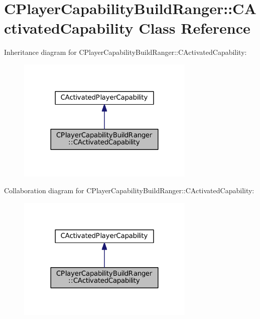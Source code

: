 \hypertarget{classCPlayerCapabilityBuildRanger_1_1CActivatedCapability}{}\section{C\+Player\+Capability\+Build\+Ranger\+:\+:C\+Activated\+Capability Class Reference}
\label{classCPlayerCapabilityBuildRanger_1_1CActivatedCapability}


Inheritance diagram for C\+Player\+Capability\+Build\+Ranger\+:\+:C\+Activated\+Capability\+:
\nopagebreak
\begin{figure}[H]
\begin{center}
\leavevmode
\includegraphics[width=240pt]{classCPlayerCapabilityBuildRanger_1_1CActivatedCapability__inherit__graph}
\end{center}
\end{figure}


Collaboration diagram for C\+Player\+Capability\+Build\+Ranger\+:\+:C\+Activated\+Capability\+:
\nopagebreak
\begin{figure}[H]
\begin{center}
\leavevmode
\includegraphics[width=240pt]{classCPlayerCapabilityBuildRanger_1_1CActivatedCapability__coll__graph}
\end{center}
\end{figure}
